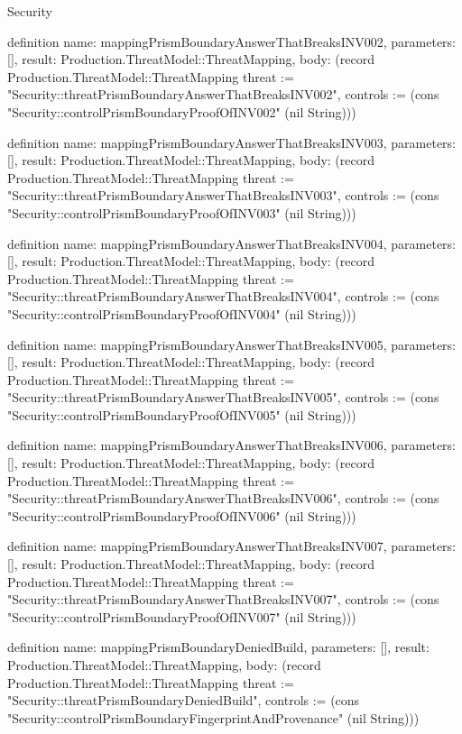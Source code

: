 \begin{lexlean}{Security}
\begin{semanticmodule}
definition{
  name: mappingPrismBoundaryAnswerThatBreaksINV002,
  parameters: [],
  result: Production.ThreatModel::ThreatMapping,
  body: (record Production.ThreatModel::ThreatMapping {threat := "Security::threatPrismBoundaryAnswerThatBreaksINV002", controls := (cons "Security::controlPrismBoundaryProofOfINV002" (nil String))})
}

definition{
  name: mappingPrismBoundaryAnswerThatBreaksINV003,
  parameters: [],
  result: Production.ThreatModel::ThreatMapping,
  body: (record Production.ThreatModel::ThreatMapping {threat := "Security::threatPrismBoundaryAnswerThatBreaksINV003", controls := (cons "Security::controlPrismBoundaryProofOfINV003" (nil String))})
}

definition{
  name: mappingPrismBoundaryAnswerThatBreaksINV004,
  parameters: [],
  result: Production.ThreatModel::ThreatMapping,
  body: (record Production.ThreatModel::ThreatMapping {threat := "Security::threatPrismBoundaryAnswerThatBreaksINV004", controls := (cons "Security::controlPrismBoundaryProofOfINV004" (nil String))})
}

definition{
  name: mappingPrismBoundaryAnswerThatBreaksINV005,
  parameters: [],
  result: Production.ThreatModel::ThreatMapping,
  body: (record Production.ThreatModel::ThreatMapping {threat := "Security::threatPrismBoundaryAnswerThatBreaksINV005", controls := (cons "Security::controlPrismBoundaryProofOfINV005" (nil String))})
}

definition{
  name: mappingPrismBoundaryAnswerThatBreaksINV006,
  parameters: [],
  result: Production.ThreatModel::ThreatMapping,
  body: (record Production.ThreatModel::ThreatMapping {threat := "Security::threatPrismBoundaryAnswerThatBreaksINV006", controls := (cons "Security::controlPrismBoundaryProofOfINV006" (nil String))})
}

definition{
  name: mappingPrismBoundaryAnswerThatBreaksINV007,
  parameters: [],
  result: Production.ThreatModel::ThreatMapping,
  body: (record Production.ThreatModel::ThreatMapping {threat := "Security::threatPrismBoundaryAnswerThatBreaksINV007", controls := (cons "Security::controlPrismBoundaryProofOfINV007" (nil String))})
}

definition{
  name: mappingPrismBoundaryDeniedBuild,
  parameters: [],
  result: Production.ThreatModel::ThreatMapping,
  body: (record Production.ThreatModel::ThreatMapping {threat := "Security::threatPrismBoundaryDeniedBuild", controls := (cons "Security::controlPrismBoundaryFingerprintAndProvenance" (nil String))})
}


\end{semanticmodule}
\end{lexlean}
